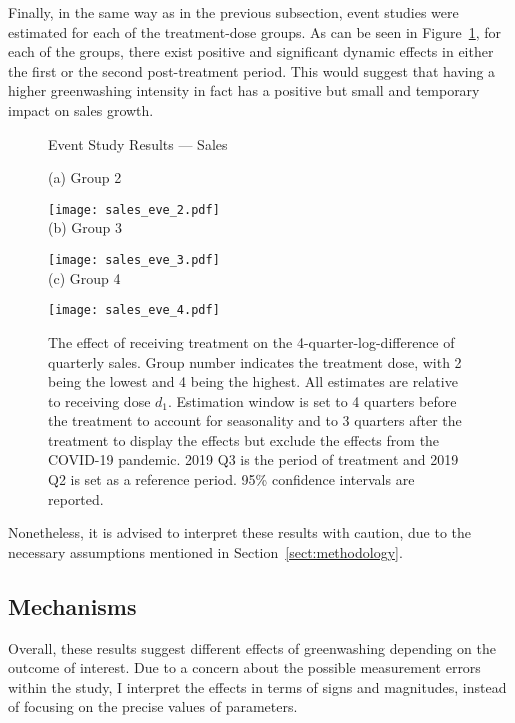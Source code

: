 \documentclass[12pt]{article}
\begin{document}
Finally, in the same way as in the previous subsection, event studies were estimated for each of the treatment-dose groups. As can be seen in Figure~\ref{fig:eve_sales}, for each of the groups, there exist positive and significant dynamic effects in either the first or the second post-treatment period. This would suggest that having a higher greenwashing intensity in fact has a positive but small and temporary impact on sales growth.


\begin{figure}
    \caption{Event Study Results --- Sales}\label{fig:eve_sales}
    \centering
    
    (a) Group 2
    
    \texttt{[image: sales\_eve\_2.pdf]} \\
    
    (b) Group 3
    
    \texttt{[image: sales\_eve\_3.pdf]} \\
    
    (c) Group 4
    
    \texttt{[image: sales\_eve\_4.pdf]}
    
    \captionsetup{font=footnotesize}
    \caption*{The effect of receiving treatment on the 4-quarter-log-difference of quarterly sales. Group number indicates the treatment dose, with 2 being the lowest and 4 being the highest. All estimates are relative to receiving dose $d_1$. Estimation window is set to 4 quarters before the treatment to account for seasonality and to 3 quarters after the treatment to display the effects but exclude the effects from the COVID-19 pandemic. 2019 Q3 is the period of treatment and 2019 Q2 is set as a reference period. 95\% confidence intervals are reported.}
\end{figure}

Nonetheless, it is advised to interpret these results with caution, due to the necessary assumptions mentioned in Section~\ref{sect:methodology}.



\subsection{Mechanisms}

Overall, these results suggest different effects of greenwashing depending on the outcome of interest. Due to a concern about the possible measurement errors within the study, I interpret the effects in terms of signs and magnitudes, instead of focusing on the precise values of parameters.
\end{document}
